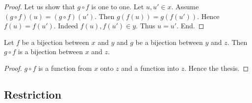 \documentclass[../../sets-and-functions.ftl.tex]{subfiles}
\begin{document}
\begin{forthel}
\begin{proof}
      Let us show that $g \circ f$ is one to one.
        Let $u,u' \in x$.
        Assume $(g \circ f)(u) = (g \circ f)(u')$.
        Then $g(f(u)) = g(f(u'))$.
        Hence $f(u) = f(u')$.
        Indeed $f(u), f(u') \in y$.
        Thus $u = u'$.
      End.
    \end{proof}

    \begin{corollary}[SF 02 01 627406]
      Let $f$ be a bijection between $x$ and $y$ and $g$ be a bijection between $y$ and $z$.
      Then $g \circ f$ is a bijection between $x$ and $z$.
    \end{corollary}
    \begin{proof}
      $g \circ f$ is a function from $x$ onto $z$ and a function into $z$.
      Hence the thesis.
    \end{proof}
  \end{forthel}


  \subsection{Restriction}
\end{document}
